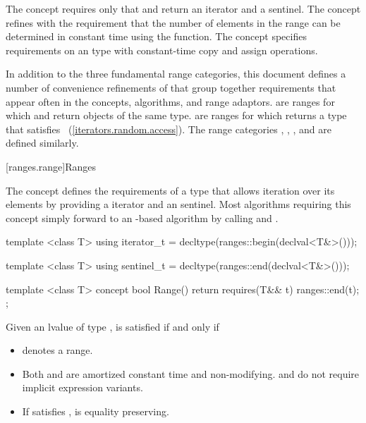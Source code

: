 \pnum
The  concept requires only that  and 
return an iterator and a sentinel. The  concept refines 
with the requirement that the number of elements in the range can be determined
in constant time using the  function. The  concept
specifies requirements on an  type
with constant-time copy and assign operations.

\pnum
In addition to the three fundamental range categories, this document defines
a number of convenience refinements of  that group together requirements
that appear often in the concepts, algorithms, and range adaptors.
 are ranges for which  and  return objects of the
same type.  are ranges for which
 returns a type that satisfies
~(\ref{iterators.random.access}). The range
categories ,
,
, and
 are defined similarly.

[ranges.range]{Ranges}

\pnum
The  concept defines the requirements of a type that allows
iteration over its elements by providing a  iterator and an
 sentinel.
\enternote Most algorithms requiring this concept simply forward to an
-based algorithm by calling  and . \exitnote

\begin{itemdecl}
template <class T>
using iterator_t = decltype(ranges::begin(declval<T&>()));

template <class T>
using sentinel_t = decltype(ranges::end(declval<T&>()));

template <class T>
concept bool Range() {
  return requires(T&& t) {
    ranges::end(t);
  };
}
\end{itemdecl}

\begin{itemdescr}

\pnum
Given an lvalue  of type ,  is satisfied
if and only if

\begin{itemize}
\item {} denotes a range.

\item Both  and  are amortized constant time
and non-modifying. \enternote {} and  do not require
implicit expression variants. \exitnote

\item If  satisfies ,
 is equality preserving.
\end{itemize}
\end{itemdescr}

